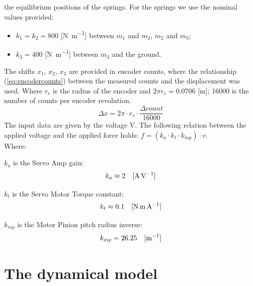the equilibrium positions of the springs.
For the springs we use the nominal values provided:
%
\begin{itemize}
	\item $k_1 = k_2 = 800$ [\si{\newton\per\meter}] between $m_1$ and $m_2$, $m_2$ 
and $m_3$;
	\item $k_3 = 400$ [\si{\newton\per\meter}] between $m_3$ and the ground.
\end{itemize}
%
The shifts $x_1$, $x_2$, $x_3$ are provided in encoder counts, where the 
relationship (\ref{eq:encodercounts}) between the measured counts and the 
displacement was used.
Where $r_{e}$ is the radius of the encoder and $2\pi r_{e} = 0.0706$ 
[\si{\meter}]; 16000 is the number of counts per encoder revolution.
%
\begin{equation}
	\Delta x = 2\pi \cdot r_{e} \cdot \frac{\Delta count}{16000}
	\label{eq:encodercounts}
\end{equation}
%
The input data are given by the voltage \si{\volt}. 
The following relation between the applied voltage and the applied force holds:
$f = (k_a \cdot k_t \cdot k_{mp}) \cdot v$.\\
Where:\begin{description}
	\item $k_a$ is the Servo Amp gain:
	\begin{equation*}
		k_a \approx 2 \quad [\text{\si{\ampere\per\volt}}]
	\end{equation*}
	\item $k_t$ is the Servo Motor Torque constant:
	\begin{equation*}
		k_t	\approx	0.1 \quad 	[\text{\si{\newton\meter\per\ampere}}]
	\end{equation*}
	\item $k_{mp}$ is the Motor Pinion pitch radius inverse:
	\begin{equation*}
		k_{mp} 	= 26.25 \quad	[\text{\si{\per\meter}}]
	\end{equation*}
\end{description}

\section{The dynamical model}
\label{sec:dynamicalmodel}

